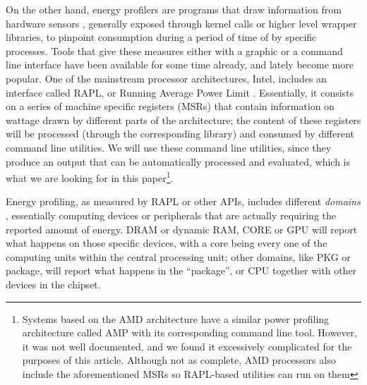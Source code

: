 \documentclass[a4paper,twoside]{article}
\begin{document}
On the other hand, energy profilers are programs that draw information from
hardware sensors \cite{sinha2001jouletrack}, generally exposed through kernel
calls or higher level wrapper libraries, to pinpoint consumption during a period
of time of by specific processes. Tools that give these measures either with a
graphic or a command line interface have been available for some time already,
and lately become more popular. One of the mainstream processor architectures,
Intel, includes an interface called RAPL, or Running Average Power Limit
\cite{rapl}. Essentially, it consists on a series of machine specific registers
(MSRs) that contain information on wattage drawn by different parts of the
architecture; the content of these registers will be processed (through the
corresponding library) and consumed by different command line utilities. We will
use these command line utilities, since they produce an output that can be
automatically processed and evaluated, which is what we are looking for in this
paper\footnote{Systems based on the AMD architecture have a similar power
  profiling architecture called AMP with its corresponding command line
  tool. However, it was not well documented, and we found it excessively
  complicated for the purposes of this article. Although not as complete, AMD
  processors also include the aforementioned MSRs so RAPL-based utilities can
  run on them}.

Energy profiling, as measured by RAPL or other APIs, includes different
\emph{domains} \cite{khan2015energy}, essentially computing devices or
peripherals that are actually requiring the reported amount of energy. DRAM or
dynamic RAM, CORE or GPU will report what happens on those specific devices,
with a core being every one of the computing units within the central processing
unit; other domains, like PKG or package, will report what happens in the
``package'', or CPU together with other devices in the chipset.
\end{document}

